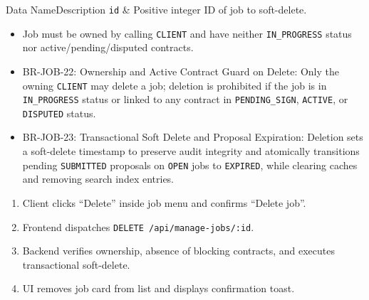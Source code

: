 
\begin{specdatatable}{Data Name}{Description}
\texttt{id} & Positive integer ID of job to soft-delete.\\ \hline
\end{specdatatable}

\begin{itemize}[leftmargin=1.6em,topsep=3pt,itemsep=2pt,parsep=0pt,label=$\bullet$]
    \item Job must be owned by calling \texttt{CLIENT} and have neither \texttt{IN\_PROGRESS} status nor active/pending/disputed contracts.
\end{itemize}

\begin{itemize}[leftmargin=1.6em,topsep=3pt,itemsep=2pt,parsep=0pt,label=$\bullet$]\brrulelist
    \item BR-JOB-22: Ownership and Active Contract Guard on Delete: Only the owning \texttt{CLIENT} may delete a job; deletion is prohibited if the job is in \texttt{IN\_PROGRESS} status or linked to any contract in \texttt{PENDING\_SIGN}, \texttt{ACTIVE}, or \texttt{DISPUTED} status.
    \item BR-JOB-23: Transactional Soft Delete and Proposal Expiration: Deletion sets a soft-delete timestamp to preserve audit integrity and atomically transitions pending \texttt{SUBMITTED} proposals on \texttt{OPEN} jobs to \texttt{EXPIRED}, while clearing caches and removing search index entries.
\end{itemize}

\begin{enumerate}[leftmargin=1.8em,topsep=3pt,itemsep=2pt,parsep=0pt]
    \item Client clicks ``Delete'' inside job menu and confirms ``Delete job''.
    \item Frontend dispatches \texttt{DELETE /api/manage-jobs/:id}.
    \item Backend verifies ownership, absence of blocking contracts, and executes transactional soft-delete.
    \item UI removes job card from list and displays confirmation toast.
\end{enumerate}

